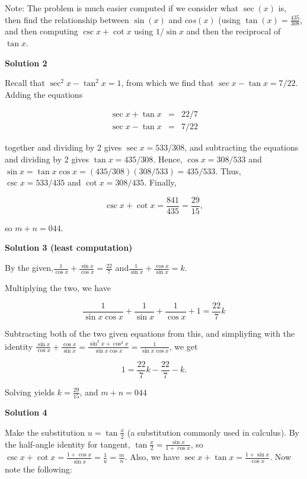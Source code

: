 \begin{enumerate}
 Note: The problem is much easier computed if we consider what $\sec (x)$ is, then find the relationship between $\sin( x)$ and $cos (x)$ (using $\tan (x) = \frac{435}{308}$, and then computing $\csc x + \cot x$ using $1/\sin x$ and then the reciprocal of $\tan x$.

 



\textbf{Solution 2}

Recall that $\sec^2 x - \tan^2 x = 1$, from which we find that $\sec x - \tan x = 7/22$. Adding the equations

 
 \begin{eqnarray*} \sec x + \tan x & = & 22/7 \\ \sec x - \tan x & = & 7/22\end{eqnarray*}

 together and dividing by 2 gives $\sec x = 533/308$, and subtracting the equations and dividing by 2 gives $\tan x = 435/308$. Hence, $\cos x = 308/533$ and $\sin x = \tan x \cos x = (435/308)(308/533) = 435/533$. Thus, $\csc x = 533/435$ and $\cot x = 308/435$. Finally,

 
 \[\csc x + \cot x = \frac {841}{435} = \frac {29}{15},\]

 so $m + n = 044$.

 



\textbf{Solution 3 (least computation)}

By the given,$\frac {1}{\cos x} + \frac {\sin x}{\cos x} = \frac {22}{7}$ and$\frac {1}{\sin x} + \frac {\cos x}{\sin x} = k$.

 Multiplying the two, we have

 
 \[\frac {1}{\sin x \cos x} + \frac {1}{\sin x} + \frac {1}{\cos x} + 1 = \frac {22}{7}k\]

 Subtracting both of the two given equations from this, and simpliyfing with the identity $\frac {\sin x}{\cos x} + \frac {\cos x}{\sin x} = \frac{\sin ^2 x + \cos ^2 x}{\sin x \cos x} = \frac {1}{\sin x \cos x}$, we get 

 
 \[1 = \frac {22}{7}k - \frac {22}{7} - k.\]

 Solving yields $k = \frac {29}{15}$, and $m+n = 044$




\textbf{Solution 4}

Make the substitution $u = \tan \frac x2$ (a substitution commonly used in calculus). By the half-angle identity for tangent, $\tan \frac x2 = \frac{\sin x}{1+\cos x}$, so $\csc x + \cot x = \frac{1+\cos x}{\sin x} = \frac1u = \frac mn$. Also, we have $\sec x + \tan x = \frac{1 + \sin x}{\cos x}.$ Now note the following:


\end{enumerate}
